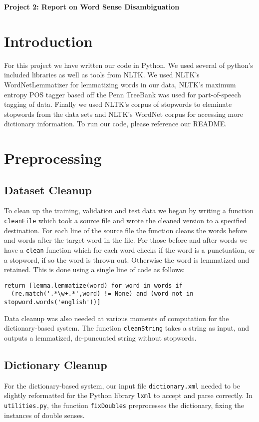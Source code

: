 \documentclass{article}
\begin{document}
\begin{center}\textbf{Project 2: Report on Word Sense Disambiguation}\end{center}

\section{Introduction}

For this project we have written our code in Python. We used several of python's included libraries as well as tools from NLTK. We used NLTK's WordNetLemmatizer for lemmatizing words in our data, NLTK's maximum entropy POS tagger based off the Penn TreeBank was used for part-of-speech tagging of data. Finally we used NLTK's corpus of stopwords to eleminate stopwords from the data sets and NLTK's WordNet corpus for accessing more dictionary information. To run our code, please reference our README.

\section{Preprocessing}

\subsection{Dataset Cleanup}

To clean up the training, validation and test data we began by writing a function \texttt{cleanFile} which took a source file and wrote the cleaned version to a specified destination. For each line of the source file the function cleans the words before and words after the target word in the file. For those before and after words we have a \texttt{clean} function which for each word checks if the word is a punctuation, or a stopword, if so the word is thrown out. Otherwise the word is lemmatized and retained. This is done using a single line of code as follows:

{\small
\begin{verbatim}
return [lemma.lemmatize(word) for word in words if
  (re.match('.*\w+.*',word) != None) and (word not in stopword.words('english'))]
\end{verbatim}
}

Data cleanup was also needed at various moments of computation for the dictionary-based system. The function \texttt{cleanString} takes a string as input, and outputs a lemmatized, de-puncuated string without stopwords.

\subsection{Dictionary Cleanup}
For the dictionary-based system, our input file \texttt{dictionary.xml} needed to be slightly reformatted for the Python library \texttt{lxml} to accept and parse correctly. In \texttt{utilities.py}, the function \texttt{fixDoubles} preprocesses the dictionary, fixing the instances of double senses.
\end{document}
